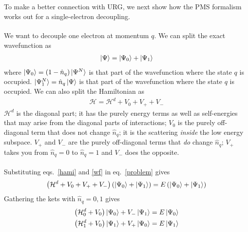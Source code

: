 \documentclass[twoside]{report}
\numberwithin{equation}{section}
\begin{document}
\\\\To make a better connection with URG, we next show how the PMS formalism works out for a single-electron decoupling.
\\\\We want to decouple one electron at momentum \(q\). We can split the exact wavefunction as
\begin{equation}\begin{aligned}
	\label{wf}
\ket{\Psi} = \ket{\Psi_0} + \ket{\Psi_1}
\end{aligned}\end{equation}
where \(\ket{\Psi_0} = \left(1 - \hat n_{q}\right)\ket{\Psi^N}\) is that part of the wavefunction where the state \(q\) is occupied. \(\ket{\Psi^N_1} = \hat n_q \ket{\Psi}\) is that part of the wavefunction where the state \(q\) is occupied. We can also split the Hamiltonian as
\begin{equation}\begin{aligned}
	\label{hami}
\mathcal{H} = \mathcal{H}^d + V_0 + V_+ + V_-
\end{aligned}\end{equation}
\(\mathcal{H}^d\) is the diagonal part; it has the purely energy terms as well as self-energies that may arise from the diagonal parts of interactions; \(V_0\) is the purely off-diagonal term that does not change \(\hat n_q\); it is the scattering \textit{inside} the low energy subspace. \(V_+\) and \(V_-\) are the purely off-diagonal terms that \textit{do} change \(\hat n_q\); \(V_+\) takes you from \(\hat n_q = 0\) to \(\hat n_q = 1\) and \(V_-\) does the opposite.
\\\\Substituting eqs.~\ref{hami} and \ref{wf} in eq.~\ref{problem} gives
\begin{equation}\begin{aligned}
	\left(\mathcal{H}^d + V_0 + V_+ + V_-\right)\left(\ket{\Psi_0} + \ket{\Psi_1}\right) = E\left(\ket{\Psi_0} + \ket{\Psi_1}\right)
\end{aligned}\end{equation}
Gathering the kets with \(\hat n_q = 0,1\) gives
\begin{equation}\begin{aligned}
	\left(\mathcal{H}^d_0 + V_0\right)\ket{\Psi_0} + V_- \ket{\Psi_1} = E\ket{\Psi_0}\\
	\left(\mathcal{H}^d_1 + V_0\right)\ket{\Psi_1} + V_+\ket{\Psi_0} = E\ket{\Psi_1}
\end{aligned}\end{equation}
\end{document}
